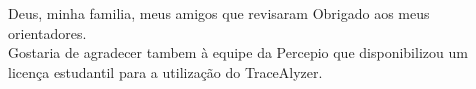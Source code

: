 \begin{comment}


\end{comment}

\begin{agradecimentos}
	Deus, minha familia, meus amigos que revisaram 
	Obrigado aos meus orientadores. \\Gostaria de agradecer tambem à equipe da Percepio que disponibilizou um licença estudantil para a utilização do TraceAlyzer.
	
\end{agradecimentos}

